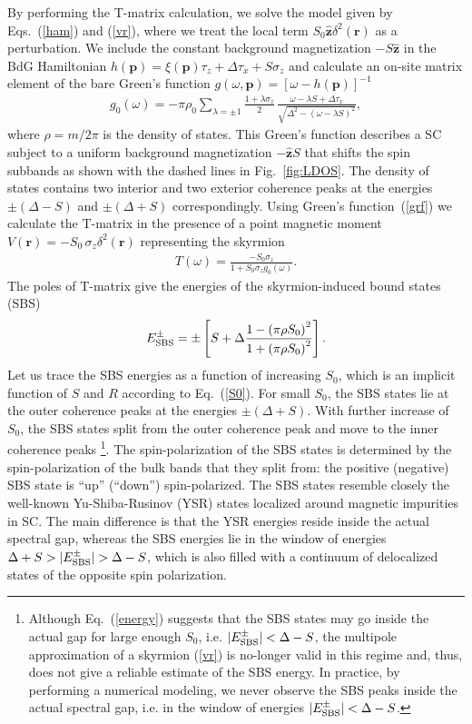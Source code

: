 \documentclass[twocolumn,showpacs,floatfix,longbibliography]{revtex4-1}
\begin{document}
By performing the T-matrix calculation, we solve the model given by Eqs.~(\ref{ham}) and (\ref{vr}), where we treat the local term $S_0 \hat{\bm z} \delta^2(\bm r)$ as a perturbation. We include the constant background magnetization $-S\hat{\bm z}$ in the BdG Hamiltonian $h(\bm p) = \xi(\bm p)\tau_z+\Delta \tau_x +  S\sigma_z$ and calculate an on-site matrix element of the bare Green's function $g(\omega,\bm p) = [\omega-h(\bm p)]^{-1}$
 \begin{align}
	 g_{0}(\omega)  =-\pi\rho_0\sum_{\lambda = \pm 1} \frac{1+\lambda\sigma_z}{2}\,\frac{\omega-\lambda S+\Delta\tau_x}{\sqrt{\Delta^2-\left( \omega-\lambda S \right)^2}},  \label{grf}
\end{align}
where $\rho = m/2\pi$ is the density of states. This Green's function describes a SC subject to a uniform background magnetization $-\hat{\bm z} S$ that shifts the spin subbands as shown with the dashed lines in Fig.~\ref{fig:LDOS}.  The density of states contains two interior and two exterior coherence peaks at the energies $\pm(\Delta-S)$ and $\pm(\Delta+S)$ correspondingly.  Using Green's function~(\ref{grf}) we calculate the T-matrix in the presence of a point magnetic moment $V(\bm r)=-S_0\,\sigma_z \delta^2(\bm r)$ representing the skyrmion
\begin{align}
	T(\omega) =   \frac{-S_0\sigma_z}{1+S_0\sigma_zg_{0}(\omega)}. \label{tm}
\end{align}
The poles of T-matrix give the energies of the skyrmion-induced bound states (SBS)
\begin{align}
	E^\pm_{\rm SBS} = \pm\left[S+\Delta \frac{1-\left( \pi\rho S_0 \right)^2}{1+\left( \pi\rho S_0 \right)^2}\right].
	\label{energy}
\end{align}
Let us trace the SBS energies as a function of increasing $S_0$, which is an implicit function of $S$ and $R$ according to Eq.~(\ref{S0}). For small $S_0$, the SBS states lie at the outer coherence peaks at the energies $\pm (\Delta+S)$. With further increase of $S_0$, the SBS states split from the outer coherence peak and move to the inner coherence peaks \footnote{Although Eq.~(\ref{energy}) suggests that the SBS states may go inside the actual gap for large enough  $S_0$, i.e. $|E^\pm_{\rm SBS}|<\Delta-S$, the multipole approximation of a skyrmion (\ref{vr}) is no-longer valid in this regime and, thus, does not give a reliable estimate of the SBS energy. In practice, by performing a numerical modeling, we never observe the SBS peaks inside the actual spectral gap, i.e. in the window of energies $|E^\pm_{\rm SBS}|<\Delta-S$.}. The spin-polarization of the SBS states is determined by the spin-polarization of the bulk bands that they split from: the positive (negative) SBS state is ``up'' (``down'') spin-polarized. The SBS states resemble closely the well-known Yu-Shiba-Rusinov (YSR) states \cite{Yu,Shiba,Rusinov,Balatsky2006} localized around magnetic impurities in SC. The main difference is that the YSR energies reside inside the actual spectral gap, whereas the SBS energies lie in the window of energies $\Delta+S>|E^\pm_{\rm SBS}|>\Delta-S$, which is also filled with a continuum of delocalized states of the opposite spin polarization.
\end{document}
